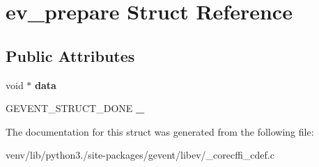 \hypertarget{structev__prepare}{}\section{ev\+\_\+prepare Struct Reference}
\label{structev__prepare}
\subsection*{Public Attributes}
\begin{DoxyCompactItemize}
\item 
\mbox{\label{structev__prepare_aaa41749b383fbc9a0f36f56e680b0d0b}} 
void $\ast$ {\bfseries data}
\item 
\mbox{\label{structev__prepare_af123f218f8fe5441a7d1c6489937b850}} 
G\+E\+V\+E\+N\+T\+\_\+\+S\+T\+R\+U\+C\+T\+\_\+\+D\+O\+NE {\bfseries \+\_\+}
\end{DoxyCompactItemize}


The documentation for this struct was generated from the following file\+:\begin{DoxyCompactItemize}
\item 
venv/lib/python3./site-\/packages/gevent/libev/\+\_\+corecffi\+\_\+cdef.\+c\end{DoxyCompactItemize}
